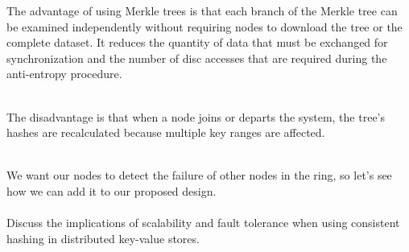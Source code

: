The advantage of using Merkle trees is that each branch of the Merkle tree can be examined independently without requiring nodes to download the tree or the complete dataset. It reduces the quantity of data that must be exchanged for synchronization and the number of disc accesses that are required during the anti-entropy procedure.\\
\strut \\
The disadvantage is that when a node joins or departs the system, the tree's hashes are recalculated because multiple key ranges are affected.\\
\strut \\
We want our nodes to detect the failure of other nodes in the ring, so let's see how we can add it to our proposed design.\\
\\
Discuss the implications of scalability and fault tolerance when using consistent hashing in distributed key-value stores.\\
\strut \\

